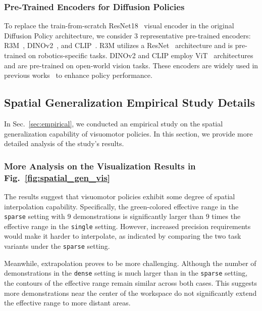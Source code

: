 \begin{appendix}
\vspace{0.2cm}\subsubsection{Pre-Trained Encoders for Diffusion Policies} 
\label{sec:appendix-policy-pretrain}
To replace the train-from-scratch ResNet18~\cite{he2016deep} visual encoder in the original Diffusion Policy architecture, we consider $3$ representative pre-trained encoders: R3M~\cite{nair2023r3m}, DINOv2~\cite{oquab2023dinov2}, and CLIP~\cite{radford2021learning}.
R3M utilizes a ResNet~\cite{he2016deep} architecture and is pre-trained on robotics-specific tasks. DINOv2 and CLIP employ ViT~\cite{dosovitskiy2021an} architectures and are pre-trained on open-world vision tasks. These encoders are widely used in previous works~\cite{chi2024umi,lin2024data} to enhance policy performance.

\subsection{Spatial Generalization Empirical Study Details}
\label{sec:appendix-empirical}

In Sec.~\ref{sec:empirical}, we conducted an empirical study on the spatial generalization capability of visuomotor policies. In this section, we provide more detailed analysis of the study's results.

\vspace{0.2cm}\subsubsection{More Analysis on the Visualization Results in Fig.~\ref{fig:spatial_gen_vis}}
\label{sec:appendix-empirical-visualize}
The results suggest that visuomotor policies exhibit some degree of spatial interpolation capability. Specifically, the green-colored effective range in the \texttt{sparse} setting with $9$ demonstrations is significantly larger than $9$ times the effective range in the \texttt{single} setting. However, increased precision requirements would make it harder to interpolate, as indicated by comparing the two task variants under the \texttt{sparse} setting.

Meanwhile, extrapolation proves to be more challenging. Although the number of demonstrations in the \texttt{dense} setting is much larger than in the \texttt{sparse} setting, the contours of the effective range remain similar across both cases. This suggests more demonstrations near the center of the workspace do not significantly extend the effective range to more distant areas.


\end{appendix}

